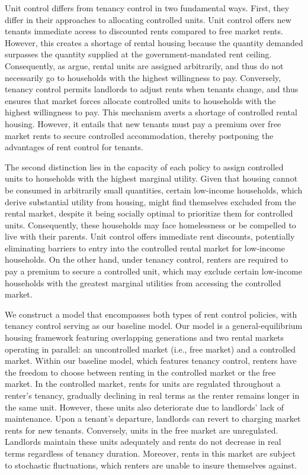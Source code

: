 \documentclass[parskip=full]{article}
\begin{document}
Unit control differs from tenancy control in two fundamental ways. First, they differ in their approaches to allocating controlled units. Unit control offers new tenants immediate access to discounted rents compared to free market rents. However, this creates a shortage of rental housing because the quantity demanded surpasses the quantity supplied at the government-mandated rent ceiling. Consequently, as \citet{gl-2003} argue, rental units are assigned arbitrarily, and thus do not necessarily go to households with the highest willingness to pay. Conversely, tenancy control permits landlords to adjust rents when tenants change, and thus ensures that market forces allocate controlled units to households with the highest willingness to pay. This mechanism averts a shortage of controlled rental housing. However, it entails that new tenants must pay a premium over free market rents to secure controlled accommodation, thereby postponing the advantages of rent control for tenants.

The second distinction lies in the capacity of each policy to assign controlled units to households with the highest marginal utility. Given that housing cannot be consumed in arbitrarily small quantities, certain low-income households, which derive substantial utility from housing, might find themselves excluded from the rental market, despite it being socially optimal to prioritize them for controlled units. Consequently, these households may face homelessness or be compelled to live with their parents. Unit control offers immediate rent discounts, potentially eliminating barriers to entry into the controlled rental market for low-income households. On the other hand, under tenancy control, renters are required to pay a premium to secure a controlled unit, which may exclude certain low-income households with the greatest marginal utilities from accessing the controlled market.

We construct a model that encompasses both types of rent control policies, with tenancy control serving as our baseline model. Our model is a general-equilibrium housing framework featuring overlapping generations and two rental markets operating in parallel: an uncontrolled market (i.e., free market) and a controlled market. Within our baseline model, which features tenancy control, renters have the freedom to choose between renting in the controlled market or the free market. In the controlled market, rents for units are regulated throughout a renter's tenancy, gradually declining in real terms as the renter remains longer in the same unit. However, these units also deteriorate due to landlords' lack of maintenance. Upon a tenant's departure, landlords can revert to charging market rents for new tenants. Conversely, units in the free market are unregulated. Landlords maintain these units adequately and rents do not decrease in real terms regardless of tenancy duration. Moreover, rents in this market are subject to stochastic fluctuations, which renters are unable to insure themselves against.
\end{document}

